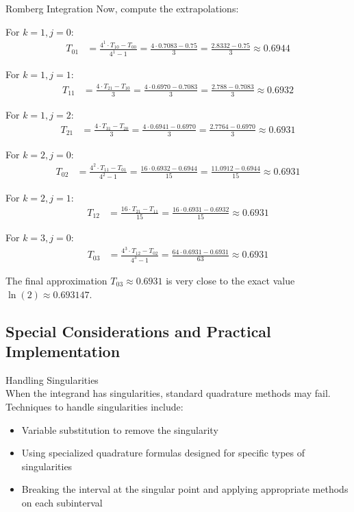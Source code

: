 \begin{example2}{Romberg Integration}
Now, compute the extrapolations:

For $k = 1, j = 0$:
\begin{align*}
T_{01} &= \frac{4^1 \cdot T_{10} - T_{00}}{4^1 - 1} = \frac{4 \cdot 0.7083 - 0.75}{3} = \frac{2.8332 - 0.75}{3} \approx 0.6944
\end{align*}

For $k = 1, j = 1$:
\begin{align*}
T_{11} &= \frac{4 \cdot T_{21} - T_{10}}{3} = \frac{4 \cdot 0.6970 - 0.7083}{3} = \frac{2.788 - 0.7083}{3} \approx 0.6932
\end{align*}

For $k = 1, j = 2$:
\begin{align*}
T_{21} &= \frac{4 \cdot T_{31} - T_{20}}{3} = \frac{4 \cdot 0.6941 - 0.6970}{3} = \frac{2.7764 - 0.6970}{3} \approx 0.6931
\end{align*}

For $k = 2, j = 0$:
\begin{align*}
T_{02} &= \frac{4^2 \cdot T_{11} - T_{01}}{4^2 - 1} = \frac{16 \cdot 0.6932 - 0.6944}{15} = \frac{11.0912 - 0.6944}{15} \approx 0.6931
\end{align*}

For $k = 2, j = 1$:
\begin{align*}
T_{12} &= \frac{16 \cdot T_{21} - T_{11}}{15} = \frac{16 \cdot 0.6931 - 0.6932}{15} \approx 0.6931
\end{align*}

For $k = 3, j = 0$:
\begin{align*}
T_{03} &= \frac{4^3 \cdot T_{12} - T_{02}}{4^3 - 1} = \frac{64 \cdot 0.6931 - 0.6931}{63} \approx 0.6931
\end{align*}

The final approximation $T_{03} \approx 0.6931$ is very close to the exact value $\ln(2) \approx 0.693147$.
\end{example2}

\subsection{Special Considerations and Practical Implementation}

\begin{concept}{Handling Singularities}\\
When the integrand has singularities, standard quadrature methods may fail. Techniques to handle singularities include:
\begin{itemize}
    \item Variable substitution to remove the singularity
    \item Using specialized quadrature formulas designed for specific types of singularities
    \item Breaking the interval at the singular point and applying appropriate methods on each subinterval
\end{itemize}
\end{concept}

